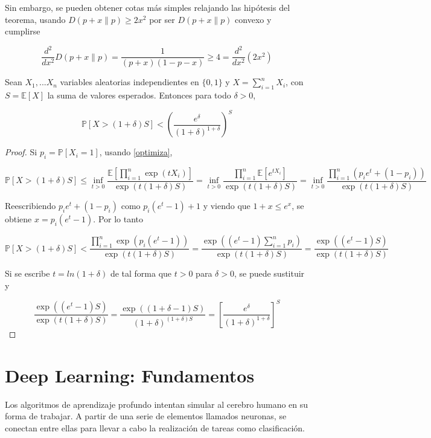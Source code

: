 Sin embargo, se pueden obtener cotas más simples relajando las hipótesis del teorema, usando $D(p+x \| p) \geq 2x^2$ por ser $D(p+x \| p)$ convexo y cumplirse

$$\frac{d^2}{dx^2} D(p+x \| p) = \frac{1}{(p+x)(1-p-x)} \geq 4= \frac{d^2}{dx^2} (2x^2)$$ 

\begin{teorema}
Sean $X_1,...X_n$ variables aleatorias independientes en $\{0,1\}$ y $X = \sum_{i=1}^n X_i$, con $S = \mathbb{E}[X]$ la suma de valores esperados. Entonces para todo $\delta > 0$,

$$\mathbb{P} \left[ X > (1+\delta) S \right] < \left( \frac{e^\delta}{(1+\delta)^{1+\delta}} \right)^S$$
\end{teorema}

\begin{proof}
Si $p_i = \mathbb{P}[X_i=1]$, usando \ref{optimiza},

\[
\mathbb{P}[X > (1+\delta) S] \leq \inf_{t>0} \frac{\mathbb{E}\left[\prod_{i=1}^n \exp(tX_i)\right]}{\exp(t(1+\delta)S)} = \inf_{t>0} \frac{\prod_{i=1}^n \mathbb{E}[e^{tX_i}]}{\exp(t(1+\delta)S)} = \inf_{t>0} \frac{\prod_{i=1}^n (p_i e^t + (1-p_i))}{\exp(t(1+\delta)S)}
\]


Reescribiendo $p_i e^t + (1-p_i)$ como $p_i (e^t - 1)+1$ y viendo que $1+x \leq e^x$, se obtiene $x=p_i(e^t-1)$. Por lo tanto

$$\mathbb{P}[X > (1+\delta)S] < \frac{\prod_{i=1}^n \exp(p_i (e^t-1))}{\exp(t(1+\delta)S)} =  \frac{\exp((e^t-1) \sum_{i=1}^n p_i)}{\exp(t(1+\delta)S)} = \frac{\exp((e^t-1)S)}{\exp(t(1+\delta)S)}$$

Si se escribe $t=ln (1+\delta)$ de tal forma que $t>0$ para $\delta > 0$, se puede sustituir y

$$\frac{\exp((e^t-1) S)}{\exp(t(1+\delta)S)} = \frac{\exp((1+\delta-1)S)}{(1+\delta)^{(1+\delta)S}} = \left[ \frac{e^\delta}{(1+\delta)^{1+\delta}} \right]^S$$

\end{proof}

\newpage

\section{Deep Learning: Fundamentos}

Los algoritmos de aprendizaje profundo intentan simular al cerebro humano en su forma de trabajar. A partir de una serie de elementos llamados neuronas, se conectan entre ellas para llevar a cabo la realización de tareas como clasificación.

